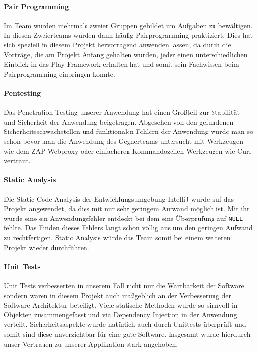 \documentclass[12pt,DIV14,BCOR10mm,a4paper,parskip=half-,headsepline,headinclude,english,ngerman,bibliography=totocnumbered]{scrreprt}
\begin{document}
\paragraph{Pair Programming} Im Team wurden mehrmals zweier Gruppen gebildet um Aufgaben zu bewältigen. In diesen Zweierteams wurden dann häufig Pairprogramming praktiziert. Dies hat sich speziell in diesem Projekt hervorragend anwenden lassen, da durch die Vorträge, die am Projekt Anfang gehalten wurden, jeder einen unterschiedlichen Einblick in das Play Framework erhalten hat und somit sein Fachwissen beim Pairprogramming einbringen konnte.


\paragraph{Pentesting} Das Penetration Testing unserer Anwendung hat einen Großteil zur Stabilität und Sicherheit der Anwendung beigetragen. Abgesehen von den gefundenen Sicherheitsschwachstellen und funktionalen Fehlern der Anwendung wurde man so schon bevor man die Anwendung des Gegnerteams untersucht mit Werkzeugen wie dem ZAP-Webproxy oder einfacheren Kommandozeilen Werkzeugen wie Curl vertraut.

\paragraph{Static Analysis} Die Static Code Analysis der Entwicklungsumgebung IntelliJ wurde auf das Projekt angewendet, da dies mit nur sehr geringem Aufwand möglich ist. Mit ihr wurde eine ein Anwendungsfehler entdeckt bei dem eine Überprüfung auf \texttt{NULL} fehlte. Das Finden dieses Fehlers langt schon völlig aus um den geringen Aufwand zu rechtfertigen. Static Analysis würde das Team somit bei einem weiteren Projekt wieder durchführen.

\paragraph{Unit Tests} Unit Tests verbesserten in unserem Fall nicht nur die Wartbarkeit der Software sondern waren in diesem Projekt auch maßgeblich an der Verbesserung der Software-Architektur beteiligt. Viele statische Methoden wurde so sinnvoll in Objekten zusammengefasst und via Dependency Injection in der Anwendung verteilt. Sicherheitsaspekte wurde natürlich auch durch Unittests überprüft und somit sind diese unverzichtbar für eine gute Software. Insgesamt wurde hierdurch unser Vertrauen zu unserer Applikation stark angehoben.
\end{document}
